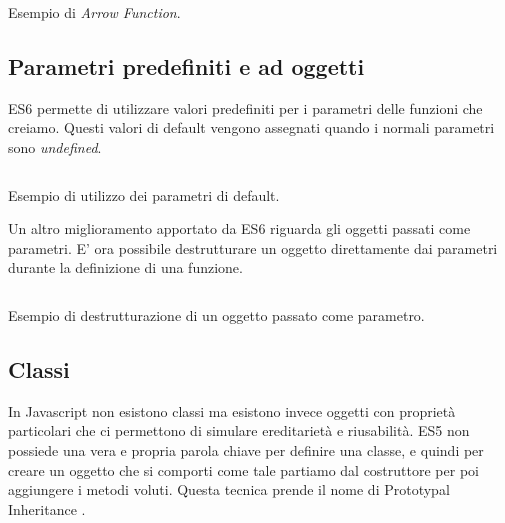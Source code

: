\begin{listing}[ht]
\inputminted{Javascript}{sources/exampleArrowFunctionES6.js}
\caption{Esempio di \textit{Arrow Function}.}
\label{exampleArrowFunctionES6}
\end{listing} 


\subsection{Parametri predefiniti e ad oggetti}
ES6 permette di utilizzare valori predefiniti per i parametri delle funzioni che creiamo. Questi valori di default vengono assegnati quando i normali parametri sono \textit{undefined}. 

\begin{listing}[ht]
\inputminted{Javascript}{sources/exampleDefaultParametersES6.js}
\caption{Esempio di utilizzo dei parametri di default.}
\label{exampleDefaultParametersES6}
\end{listing}

\noindent
Un altro miglioramento apportato da ES6 riguarda gli oggetti passati come parametri. E' ora possibile destrutturare un oggetto direttamente dai parametri durante la definizione di una funzione.

\begin{listing}[ht]
\inputminted{Javascript}{sources/exampleObjectParameterES6.js}
\caption{Esempio di destrutturazione di un oggetto passato come parametro.}
\label{exampleObjectParameterES6}
\end{listing}

\subsection{Classi}
In Javascript non esistono classi ma esistono invece oggetti con proprietà particolari che ci permettono di simulare ereditarietà e riusabilità. ES5 non possiede una vera e propria parola chiave per definire una classe, e quindi per creare un oggetto che si comporti come tale partiamo dal costruttore per poi aggiungere i metodi voluti. Questa tecnica prende il nome di Prototypal Inheritance \cite{RylanOnPrototypeInheritance}.

